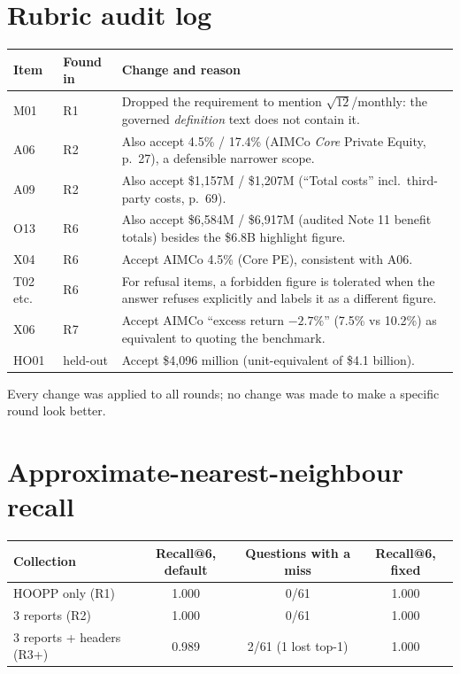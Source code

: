 \documentclass[11pt,a4paper]{article}
\begin{document}
\section{Rubric audit log}
\label{app:audit}
\begin{table}[H]
\centering\small
\begin{tabularx}{\textwidth}{llX}
\toprule
Item & Found in & Change and reason\\
\midrule
M01 & R1 & Dropped the requirement to mention $\sqrt{12}$/monthly: the governed \emph{definition} text does not contain it.\\
A06 & R2 & Also accept 4.5\% / 17.4\% (AIMCo \emph{Core} Private Equity, p.~27), a defensible narrower scope.\\
A09 & R2 & Also accept \$1,157M / \$1,207M (``Total costs'' incl.\ third-party costs, p.~69).\\
O13 & R6 & Also accept \$6,584M / \$6,917M (audited Note 11 benefit totals) besides the \$6.8B highlight figure.\\
X04 & R6 & Accept AIMCo 4.5\% (Core PE), consistent with A06.\\
T02 etc. & R6 & For refusal items, a forbidden figure is tolerated when the answer refuses explicitly and labels it as a different figure.\\
X06 & R7 & Accept AIMCo ``excess return $-2.7\%$'' (7.5\% vs 10.2\%) as equivalent to quoting the benchmark.\\
HO01 & held-out & Accept \$4,096 million (unit-equivalent of \$4.1 billion).\\
\bottomrule
\end{tabularx}
\end{table}
\noindent Every change was applied to all rounds; no change was made to make a specific round look better.

\section{Approximate-nearest-neighbour recall}
\begin{table}[H]
\centering\small
\begin{tabular}{lccc}
\toprule
Collection & Recall@6, default & Questions with a miss & Recall@6, fixed\\
\midrule
HOOPP only (R1) & 1.000 & 0/61 & 1.000\\
3 reports (R2) & 1.000 & 0/61 & 1.000\\
3 reports + headers (R3+) & 0.989 & 2/61 (1 lost top-1) & 1.000\\
\bottomrule
\end{tabular}
\end{table}
\end{document}
